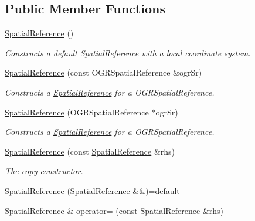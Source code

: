 \subsection*{Public Member Functions}
\begin{DoxyCompactItemize}
\item 
\hyperlink{group___imagery_module_ga2e25c945785b2ff07d5d74799e7f6bf2}{Spatial\+Reference} ()
\begin{DoxyCompactList}\small\item\em Constructs a default \hyperlink{classdg_1_1deepcore_1_1imagery_1_1_spatial_reference}{Spatial\+Reference} with a local coordinate system. \end{DoxyCompactList}\item 
\hyperlink{group___imagery_module_ga452d78706b3707b85196d436524990ce}{Spatial\+Reference} (const O\+G\+R\+Spatial\+Reference \&ogr\+Sr)
\begin{DoxyCompactList}\small\item\em Constructs a \hyperlink{classdg_1_1deepcore_1_1imagery_1_1_spatial_reference}{Spatial\+Reference} for a O\+G\+R\+Spatial\+Reference. \end{DoxyCompactList}\item 
\hyperlink{group___imagery_module_ga7a9a85f737572787a550c16479d81a71}{Spatial\+Reference} (O\+G\+R\+Spatial\+Reference $\ast$ogr\+Sr)
\begin{DoxyCompactList}\small\item\em Constructs a \hyperlink{classdg_1_1deepcore_1_1imagery_1_1_spatial_reference}{Spatial\+Reference} for a O\+G\+R\+Spatial\+Reference. \end{DoxyCompactList}\item 
\hyperlink{group___imagery_module_gabc2eddb1ac0a4675ae9a26afc6f217e9}{Spatial\+Reference} (const \hyperlink{classdg_1_1deepcore_1_1imagery_1_1_spatial_reference}{Spatial\+Reference} \&rhs)
\begin{DoxyCompactList}\small\item\em The copy constructor. \end{DoxyCompactList}\item 
\hyperlink{classdg_1_1deepcore_1_1imagery_1_1_spatial_reference_a71f3d2ded7756f76859b6f709566690a}{Spatial\+Reference} (\hyperlink{classdg_1_1deepcore_1_1imagery_1_1_spatial_reference}{Spatial\+Reference} \&\&)=default
\item 
\hyperlink{classdg_1_1deepcore_1_1imagery_1_1_spatial_reference}{Spatial\+Reference} \& \hyperlink{group___imagery_module_ga57789396d3366fae0ec1fdc83832ee5b}{operator=} (const \hyperlink{classdg_1_1deepcore_1_1imagery_1_1_spatial_reference}{Spatial\+Reference} \&rhs)

\end{DoxyCompactItemize}
